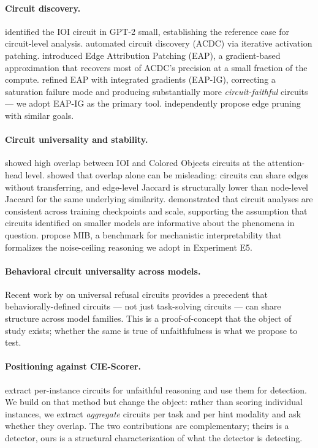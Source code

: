 \documentclass[11pt]{article}
\begin{document}
\paragraph{Circuit discovery.} \citet{wang2023} identified the IOI circuit in GPT-2 small, establishing the reference case for circuit-level analysis. \citet{conmy2023} automated circuit discovery (ACDC) via iterative activation patching. \citet{syed2024} introduced Edge Attribution Patching (EAP), a gradient-based approximation that recovers most of ACDC's precision at a small fraction of the compute. \citet{hanna2024} refined EAP with integrated gradients (EAP-IG), correcting a saturation failure mode and producing substantially more \emph{circuit-faithful} circuits --- we adopt EAP-IG as the primary tool. \citet{bhaskar2024} independently propose edge pruning with similar goals.

\paragraph{Circuit universality and stability.} \citet{merullo2024} showed high overlap between IOI and Colored Objects circuits at the attention-head level. \citet{hanna2024} showed that overlap alone can be misleading: circuits can share edges without transferring, and edge-level Jaccard is structurally lower than node-level Jaccard for the same underlying similarity. \citet{tigges2024} demonstrated that circuit analyses are consistent across training checkpoints and scale, supporting the assumption that circuits identified on smaller models are informative about the phenomena in question. \citet{mueller2025} propose MIB, a benchmark for mechanistic interpretability that formalizes the noise-ceiling reasoning we adopt in Experiment E5.

\paragraph{Behavioral circuit universality across models.} Recent work by \citet{cristofano2026} on universal refusal circuits provides a precedent that behaviorally-defined circuits --- not just task-solving circuits --- can share structure across model families. This is a proof-of-concept that the object of study exists; whether the same is true of unfaithfulness is what we propose to test.

\paragraph{Positioning against CIE-Scorer.} \citet{shen2026} extract per-instance circuits for unfaithful reasoning and use them for detection. We build on that method but change the object: rather than scoring individual instances, we extract \emph{aggregate} circuits per task and per hint modality and ask whether they overlap. The two contributions are complementary; theirs is a detector, ours is a structural characterization of what the detector is detecting.
\end{document}
